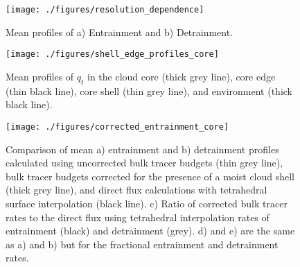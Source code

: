 \documentclass[draft,grl]{AGUTeX}
\begin{document}
\begin{article}






%
%

\end{article}




\begin{figure}
  \label{fig:resolution_dependence}
  \noindent\texttt{[image: ./figures/resolution\_dependence]}
  \caption{Mean profiles of a) Entrainment and b) Detrainment.}
\end{figure}

\begin{figure}
  \label{fig:shell_edge_profiles}
  \noindent\texttt{[image: ./figures/shell\_edge\_profiles\_core]}
  \caption{Mean profiles of $q_t$ in the cloud core (thick grey line), core 
edge (thin black line), core shell (thin grey line), and environment (thick 
black line).}
\end{figure}

\begin{figure}
  \label{fig:corrected_entrainment}
  \noindent\texttt{[image: ./figures/corrected\_entrainment\_core]}
  \caption{Comparison of mean a) entrainment and b) detrainment profiles 
calculated using uncorrected bulk tracer budgets (thin grey line), bulk tracer 
budgets corrected for the presence of a moist cloud shell (thick grey line), and
direct flux calculations with tetrahedral surface interpolation (black line).
c) Ratio of corrected bulk tracer rates to the direct flux using
tetrahedral interpolation rates of entrainment (black) and detrainment (grey).
d) and e) are the same as a) and b) but for the fractional entrainment and
detrainment rates.}
\end{figure}
\end{document}
